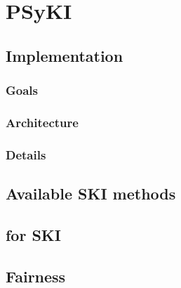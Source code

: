 
\chapter{\Acl{PSyKI}}
\label{ch:psyki}

\section{Implementation}\label{sec:implementation}

\subsection{Goals}\label{subsec:goals}

\subsection{Architecture}\label{subsec:architecture}

\subsection{Details}\label{subsec:details}

\section{Available \Gls{SKI} methods}\label{sec:available-ski-methods}

\subsection{}\label{subsec:kbann}

\subsection{}\label{subsec:kins}

\subsection{}\label{subsec:kill}

\section{ for \Gls{SKI}}\label{sec:qos}

\section{Fairness}\label{sec:fairness}

\subsection{}\label{subsec:fauci}
